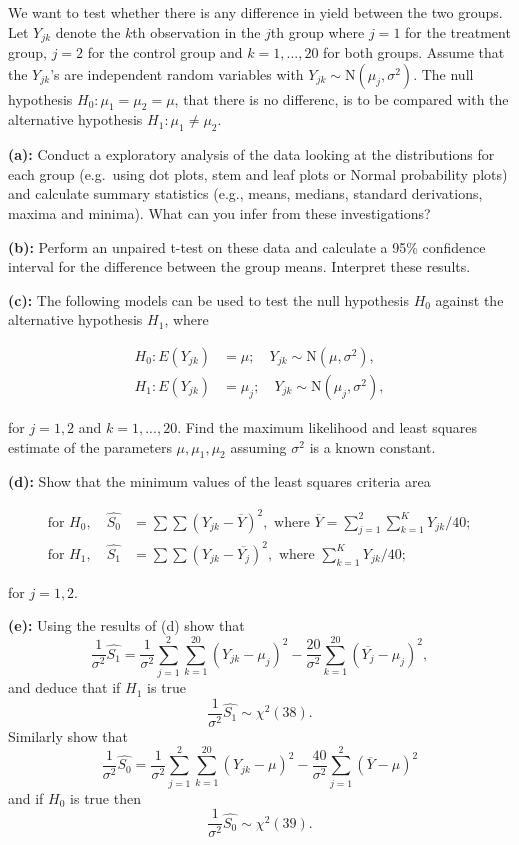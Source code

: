\documentclass[]{article}
\begin{document}
We want to test whether there is any difference in yield between the two
groups. Let \(Y_{jk}\) denote the \(k\)th observation in the \(j\)th
group where \(j = 1\) for the treatment group, \(j = 2\) for the control
group and \(k = 1,...,20\) for both groups. Assume that the \(Y_{jk}\)'s
are independent random variables with
\(Y_{jk} \sim \text{N}(\mu_j, \sigma^2)\). The null hypothesis
\(H_0: \mu_1 = \mu_2 = \mu\), that there is no differenc, is to be
compared with the alternative hypothesis \(H_1 : \mu_1 \neq \mu_2\).

\textbf{(a):} Conduct a exploratory analysis of the data looking at the
distributions for each group (e.g.~using dot plots, stem and leaf plots
or Normal probability plots) and calculate summary statistics (e.g.,
means, medians, standard derivations, maxima and minima). What can you
infer from these investigations?

\textbf{(b):} Perform an unpaired t-test on these data and calculate a
95\% confidence interval for the difference between the group means.
Interpret these results.

\textbf{(c):} The following models can be used to test the null
hypothesis \(H_0\) against the alternative hypothesis \(H_1\), where

\begin{align*}
H_0 : E(Y_{jk}) &= \mu;\quad Y_{jk} \sim \text{N}(\mu, \sigma^2),\\
H_1 : E(Y_{jk}) &= \mu_j;\quad Y_{jk} \sim \text{N}(\mu_j, \sigma^2),
\end{align*}

for \(j = 1,2\) and \(k = 1,...,20\). Find the maximum likelihood and
least squares estimate of the parameters \(\mu, \mu_1, \mu_2\) assuming
\(\sigma^2\) is a known constant.

\textbf{(d):} Show that the minimum values of the least squares criteria
area

\begin{align*}
\text{for } H_0, \quad \hat{S_0} &=  \sum \sum (Y_{jk} - \overline{Y})^2, \text{ where } \overline{Y} = \sum_{j=1}^2\sum_{k=1}^K Y_{jk}/40;\\
\text{for } H_1, \quad \hat{S_1} &= \sum \sum (Y_{jk} - \overline{Y_j})^2, \text{ where } \sum_{k=1}^K Y_{jk}/40;
\end{align*}

for \(j = 1,2\).

\textbf{(e):} Using the results of (d) show that \[
\frac{1}{\sigma^2}\hat{S_1} = \frac{1}{\sigma^2}\sum_{j=1}^2\sum_{k=1}^{20}(Y_{jk} - \mu_j)^2 - \frac{20}{\sigma^2}\sum^{20}_{k=1}(\overline{Y_j} - \mu_j)^2,
\] and deduce that if \(H_1\) is true \[
\frac{1}{\sigma^2}\hat{S_1} \sim \chi^2(38).
\] Similarly show that \[
\frac{1}{\sigma^2}\hat{S_0} = \frac{1}{\sigma^2}\sum_{j=1}^2\sum_{k=1}^{20}(Y_{jk} - \mu)^2 - \frac{40}{\sigma^2}\sum_{j=1}^2(\overline{Y} - \mu)^2
\] and if \(H_0\) is true then \[
\frac{1}{\sigma^2}\hat{S_0} \sim \chi^2(39).
\]
\end{document}
